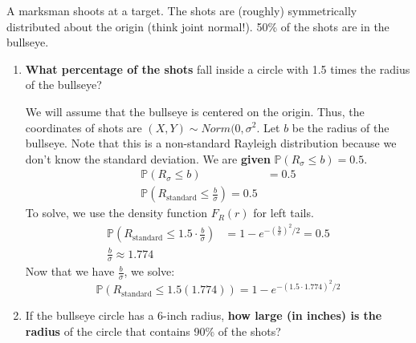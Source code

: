 \documentclass[titlepage, 12pt, leqno]{article}
\begin{document}
\begin{ex}
    A marksman shoots at a target. The shots are (roughly) symmetrically distributed about
    the origin (think joint normal!). 50\% of the shots are in the bullseye.
    \begin{enumerate}
        \item \textbf{What percentage of the shots} fall inside a circle with 1.5 times the
            radius of the bullseye?
            \vspace{10px}
            
            We will assume that the bullseye is centered on the origin. Thus, the 
            coordinates of shots are $(X,Y) \sim Norm(0, \sigma^2$. Let $b$ be the radius
            of the bullseye. Note that this is a non-standard Rayleigh distribution
            because we don't know the standard deviation. We are \textbf{given} 
            $\mathbb{P}(R_\sigma \le b) = 0.5$.
            \begin{align*}
                \mathbb{P}(R_\sigma \le b) &= 0.5 \\
                \mathbb{P}(R_\text{standard} \le \frac{b}{\sigma}) = 0.5
            \end{align*}
            To solve, we use the density function $F_R(r)$ for left tails.
            \begin{align*}
                \mathbb{P}\left(R_\text{standard} \le 1.5\cdot\frac{b}{\sigma}\right) &= 
                1 - e^{-\left(\frac{b}{\sigma}\right)^2/2} = 0.5 \\
                \frac{b}{\sigma} \approx 1.774
            \end{align*}
            Now that we have $\frac{b}{\sigma}$, we solve:
            \[
                \boxed{\mathbb{P}(R_\text{standard} \le 1.5(1.774)) =
                1-e^{-(1.5\cdot 1.774)^2/2}}
            \]

        \item If the bullseye circle has a 6-inch radius, \textbf{how large (in inches) 
            is the radius} of the circle that contains 90\% of the shots?
            \vspace{10px}
            

\end{enumerate}
\end{ex}
\end{document}
